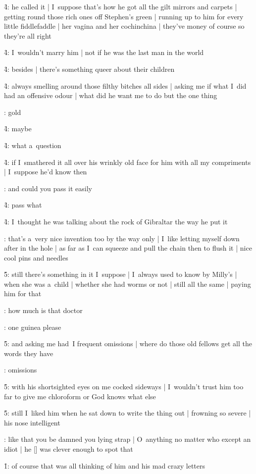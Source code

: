 \f4:
he called it |
I~suppose that's how he got all the gilt mirrors and carpets |
getting round those rich ones off Stephen's green |
running up to him for every little fiddlefaddle |
her vagina and her cochinchina |
they've money of course so they're all right

\f4:
I~wouldn't marry him |
not if he was the last man in the world

\f4:
besides |
there's something queer about their children

\f4:
always smelling around those filthy bitches all sides |
asking me if what I~did had an offensive odour |
what did he want me to do but the one thing

:
gold

\f4:
maybe

\f4:
what a~question

\f4:
if I~smathered it all over his wrinkly old face for him
with all my compriments |
I~suppose he'd know then

:
and could you pass it easily

\f4:
pass what

\f4:
I~thought he was talking about the rock of Gibraltar the way he put it

:
that's a~very nice invention too by the way only |
I~like letting myself down after in the hole |
as far as I~can squeeze and pull the chain then to flush it |
nice cool pins and needles

\f5:
still there's something in it I~suppose |
I~always used to know by Milly's |
when she was a~child |
whether she had worms or not |
still all the same |
paying him for that

:
how much is that doctor

:
one guinea please

\f5:
and asking me had~I frequent omissions |
where do those old fellows get all the words they have

:
omissions

\f5:
with his shortsighted eyes on me cocked sideways |
I~wouldn't trust him too far to give me chloroform or God knows what else

\f5:
still I~liked him when he sat down to write the thing out |
frowning so severe |
his nose intelligent

:
like that you be damned you lying strap |
O~anything no matter who except an idiot |
he [\bloom] was clever enough to spot that

\f1:
of course that was all thinking of him and his mad crazy letters

